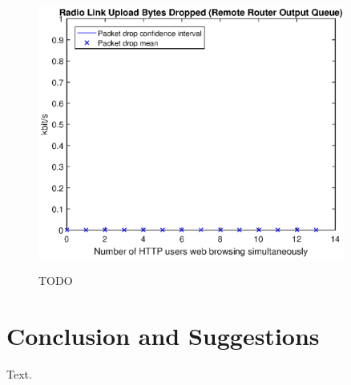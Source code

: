\documentclass[a4paper,10pt]{book}\usepackage{graphicx}
\begin{document}
\begin{figure}[!ht]
  \centering
    \includegraphics[width=0.9\textwidth]{on_remote_router_drops.eps}
    \label{fig:on_remote_router_drops}
    \caption{TODO}
\end{figure}
         

\chapter{Conclusion and Suggestions}

Text.

	
	
\end{document}
